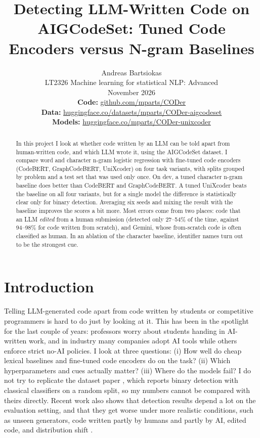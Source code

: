 \documentclass[11pt]{article}
\title{Detecting LLM-Written Code on AIGCodeSet: Tuned Code Encoders versus N-gram Baselines}
\author{Andreas Bartsiokas \\
  LT2326 Machine learning for statistical NLP: Advanced \\
  November 2026 \\
  {\small \textbf{Code:} \href{https://github.com/mparts/CODer}{github.com/mparts/CODer}} \\
  {\small \textbf{Data:} \href{https://huggingface.co/datasets/mparts/CODer-aigcodeset}{huggingface.co/datasets/mparts/CODer-aigcodeset}} \\
  {\small \textbf{Models:} \href{https://huggingface.co/mparts/CODer-unixcoder}{huggingface.co/mparts/CODer-unixcoder}}}
\begin{document}
\maketitle

\begin{abstract}
In this project I look at whether code written by an LLM can be told apart from human-written code, and which LLM wrote it, using the AIGCodeSet dataset. I compare word and character n-gram logistic regression with fine-tuned code encoders (CodeBERT, GraphCodeBERT, UniXcoder) on four task variants, with splits grouped by problem and a test set that was used only once. On dev, a tuned character n-gram baseline does better than CodeBERT and GraphCodeBERT. A tuned UniXcoder beats the baseline on all four variants, but for a single model the difference is statistically clear only for binary detection. Averaging six seeds and mixing the result with the baseline improves the scores a bit more. Most errors come from two places: code that an LLM \emph{edited} from a human submission (detected only 27--54\% of the time, against 94--98\% for code written from scratch), and Gemini, whose from-scratch code is often classified as human. In an ablation of the character baseline, identifier names turn out to be the strongest cue.
\end{abstract}

\section{Introduction}
\label{sec:intro}

Telling LLM-generated code apart from code written by students or competitive programmers is hard to do just by looking at it. This has been in the spotlight for the last couple of years: professors worry about students handing in AI-written work, and in industry many companies adopt AI tools while others enforce strict no-AI policies. I look at three questions: (i) How well do cheap lexical baselines and fine-tuned code encoders do on the task? (ii) Which hyperparameters and cues actually matter? (iii) Where do the models fail? I do not try to replicate the dataset paper \citep{demirok-kutlu-2025-aigcodeset}, which reports binary detection with classical classifiers on a random split, so my numbers cannot be compared with theirs directly. Recent work also shows that detection results depend a lot on the evaluation setting, and that they get worse under more realistic conditions, such as unseen generators, code written partly by humans and partly by AI, edited code, and distribution shift \citep{orel-etal-2026-aicd,demirok-etal-2026-multiaigcd}.
\end{document}
